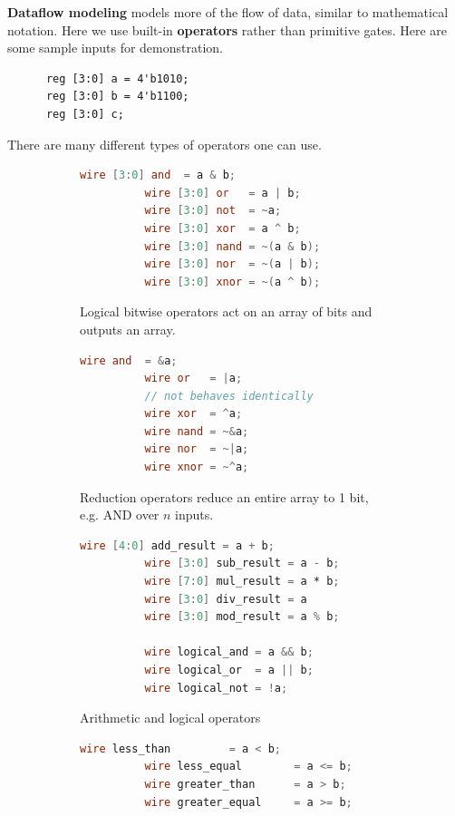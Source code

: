   \begin{definition}
    \label{def:dataflow-modeling}
    \textbf{Dataflow modeling} models more of the flow of data, similar to mathematical notation. Here we use built-in \textbf{operators} rather than primitive gates. Here are some sample inputs for demonstration.
    \begin{lstlisting}
      reg [3:0] a = 4'b1010;
      reg [3:0] b = 4'b1100;
      reg [3:0] c;
    \end{lstlisting}
    There are many different types of operators one can use. 

    \begin{figure}[H]
      \centering
      \begin{subfigure}[b]{0.48\textwidth}
        \centering
        \begin{lstlisting}[language=Verilog]
          wire [3:0] and  = a & b;   
          wire [3:0] or   = a | b;   
          wire [3:0] not  = ~a;      
          wire [3:0] xor  = a ^ b;   
          wire [3:0] nand = ~(a & b);
          wire [3:0] nor  = ~(a | b);
          wire [3:0] xnor = ~(a ^ b);
        \end{lstlisting}
        \caption{Logical bitwise operators act on an array of bits and outputs an array.} 
      \end{subfigure}
      \hfill 
      \begin{subfigure}[b]{0.48\textwidth}
        \centering
        \begin{lstlisting}[language=Verilog]
          wire and  = &a;    
          wire or   = |a;    
          // not behaves identically
          wire xor  = ^a;    
          wire nand = ~&a;   
          wire nor  = ~|a;   
          wire xnor = ~^a;   
        \end{lstlisting}
        \caption{Reduction operators reduce an entire array to 1 bit, e.g. AND over $n$ inputs.}
      \end{subfigure}

      \begin{subfigure}[b]{0.48\textwidth}
        \centering
        \begin{lstlisting}[language=Verilog]
          wire [4:0] add_result = a + b;    
          wire [3:0] sub_result = a - b;    
          wire [7:0] mul_result = a * b;    
          wire [3:0] div_result = a 
          wire [3:0] mod_result = a % b;    

          wire logical_and = a && b;  
          wire logical_or  = a || b;  
          wire logical_not = !a;      
        \end{lstlisting}
        \caption{Arithmetic and logical operators}
      \end{subfigure}
      \hfill 
      \begin{subfigure}[b]{0.48\textwidth}
        \centering
        \begin{lstlisting}[language=Verilog]
          wire less_than         = a < b;   
          wire less_equal        = a <= b;  
          wire greater_than      = a > b;   
          wire greater_equal     = a >= b;  


\end{lstlisting}
\end{subfigure}
\end{figure}
\end{definition}
